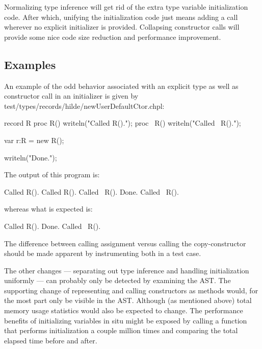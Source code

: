 Normalizing type inference will get rid of the extra type variable initialization code.
After which, unifying the initialization code just means adding a  call
wherever no explicit initializer is provided.  Collapsing constructor calls will provide
some nice code size reduction and performance improvement.

\subsection{Examples}

An example of the odd behavior associated with an explicit type as well as constructor
call in an initializer is given by test/types/records/hilde/newUserDefaultCtor.chpl:
\begin{chapel}
record R
{
  proc R() { writeln("Called R()."); }
  proc ~R() { writeln("Called ~R()."); }
}

var r:R = new R();

writeln("Done.");
\end{chapel}
The output of this program is:
\begin{chapelprintoutput}
Called R().
Called R().
Called ~R().
Done.
Called ~R().
\end{chapelprintoutput}
\noindent
whereas what is expected is:
\begin{chapelprintoutput}
Called R().
Done.
Called ~R().
\end{chapelprintoutput}


The difference between calling assignment versus calling the copy-constructor should be
made apparent by instrumenting both in a test case.

The other changes --- separating out type inference and handling initialization uniformly
--- can probably only be detected by examining the AST.  The supporting change of
representing and calling constructors as methods would, for the most part only be visible
in the AST.  Although (as mentioned above) total memory usage statistics would also be
expected to change.  The performance benefits of initializing variables in situ might be
exposed by calling a function that performs initialization a couple million times and
comparing the total elapsed time before and after.

